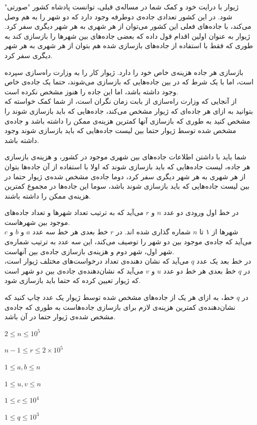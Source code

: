 \documentclass[11.5pt,a4paper,oneside]{article}
\begin{document}
\def\problemCode{Repairing Roads}
\def\problemEnglishTitle{Repairing Roads}
\def\problemFarsiTitle{بازسازی جاده‌ها}
\def\timeLimit{$2$ \second}
\def\memLimit{$256$ \megabytes}
\begin{problem}
ژیوار با درایت خود و کمک شما در مساله‌ی قبلی، توانست پادشاه کشور "صورتی" شود. در این کشور تعدادی جاده‌ی دوطرفه‌ وجود دارد که دو شهر را به هم وصل می‌کند، با جاده‌های فعلی این کشور می‌توان از هر شهری به هر شهر دیگری سفر کرد.
ژیوار به عنوان اولین اقدام قول داده که بعضی جاده‌های بین شهر‌ها را بازسازی کند به طوری که فقط با استفاده از جاده‌های بازسازی شده هم بتوان از هر شهری به هر شهر دیگری سفر کرد.

بازسازی هر جاده هزینه‌ی خاص خود را دارد. ژیوار کار را به وزارت راه‌سازی سپرده است، اما با یک شرط که در بین جاده‌هایی که باز‌سازی می‌شوند، حتما یک جاده‌ی خاص وجود داشته باشد، اما این جاده‌ را هنوز مشخص نکرده است.
\\
از آنجایی که وزارت راه‌سازی از بابت زمان نگران است، از شما کمک خواسته که بتوانید به ازای هر جاده‌ای که ژیوار مشخص می‌کند، جاده‌هایی که باید بازسازی شوند را مشخص کنید به طوری که بازسازی آنها کمترین هزینه‌ی ممکن را داشته باشد و جاده‌ی مشخص شده توسط ژیوار حتما بین لیست جاده‌هایی که باید بازسازی شوند وجود داشته باشد.

شما باید با داشتن اطلاعات جاده‌های بین شهری موجود در کشور، و هزینه‌ی بازسازی هر جاده، لیست جاده‌هایی که باید بازسازی شوند که اولا با استفاده از آن جاده‌ها بتوان از هر شهری به هر شهر دیگری سفر کرد، دوما جاده‌ی مشخص شده‌ی ژیوار حتما در بین لیست جاده‌هایی که باید بازسازی شوند باشد، سوما این جاده‌ها در مجموع کمترین هزینه‌ی ممکن را داشته باشند.

در خط اول ورودی دو عدد $n$ و $r$ می‌آید که به ترتیب تعداد شهر‌ها و تعداد جاده‌های موجود بین شهر‌هاست.\\
شهرها از ۱ تا $n$ شماره گذاری شده اند. در $r$ خط بعدی هر خط سه عدد $a$ و $b$ و $c$ می‌آید که جاده‌ی موجود بین دو شهر را توصیف می‌کند، این سه عدد به ترتیب شماره‌ی شهر اول، شهر دوم و هزینه‌ی بازسازی جاده‌ی بین آنهاست.\\
در خط بعد یک عدد $q$ می‌آید که نشان دهنده‌ی تعداد درخواست‌های مختلف ژیوار است، در $q$ خط بعدی هر خط دو عدد $u$ و $v$ می‌آید که نشان‌دهنده‌ی جاده‌ی بین دو شهر است که ژیوار تعیین کرده که حتما باید بازسازی شود.

\outputDescription
در $q$ خط، به ازای هر یک از جاده‌های مشخص شده توسط ژیوار یک عدد چاپ کنید که نشان‌دهنده‌ی کمترین هزینه‌ی لازم برای بازسازی جاده‌هاست به طوری که جاده‌ی مشخص شده‌ی ژیوار حتما در آن باشد.

\constraints
\begin{shortitems}
\item $2 \le n \le 10^5$
\item $n-1 \le r \le 2 \times 10^5$
\item $1 \le a, b \le n$
\item $1 \le u, v \le n$
\item $1 \le c \le 10^4$
\item $1 \le q \le 10^3$
\end{shortitems}


\end{problem}
\end{document}
